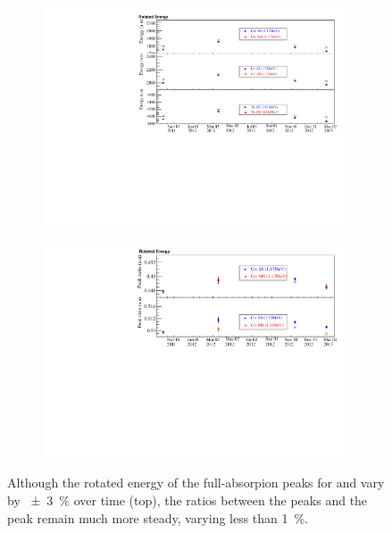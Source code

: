 \documentclass[herrin-thesis.tex]{subfiles}
\begin{document}
\begin{figure}[htb]
\centering
\begin{subfigure}[b]{0.75\textwidth}
\centering
\includegraphics[width=\textwidth]{./plots/data_peak_energy_v_time.pdf}
\end{subfigure}
\begin{subfigure}[b]{0.75\textwidth}
\centering
\includegraphics[width=1\textwidth]{./plots/data_peak_ratio_v_time.pdf}
\end{subfigure}
\caption[Variation of full-absorption peak energies and peak energy ratios over time.]{Although the rotated energy of the full-absorpion peaks for  and  vary by \about{}\SI{\pm3}{\percent} over time (top), the ratios between the  peaks and the  peak remain much more steady, varying less than \SI{1}{\percent}.}
\label{fig:data_energy_ratios_time}
\end{figure}
\end{document}

